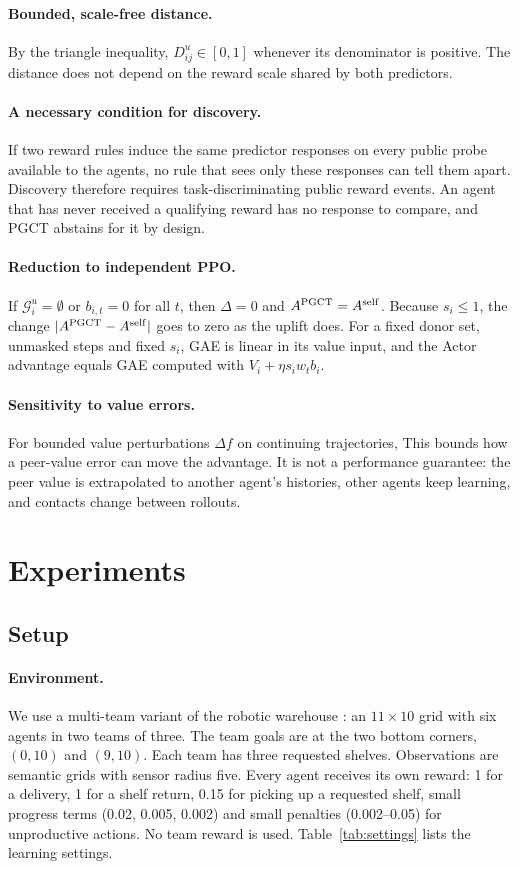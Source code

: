 \documentclass{article}
\begin{document}
\paragraph{Bounded, scale-free distance.} By the triangle inequality, $D_{ij}^u\in[0,1]$ whenever its denominator is positive. The distance does not depend on the reward scale shared by both predictors.

\paragraph{A necessary condition for discovery.} If two reward rules induce the same predictor responses on every public probe available to the agents, no rule that sees only these responses can tell them apart. Discovery therefore requires task-discriminating public reward events. An agent that has never received a qualifying reward has no response to compare, and PGCT abstains for it by design.

\paragraph{Reduction to independent PPO.} If $\mathcal G_i^u=\emptyset$ or $b_{i,t}=0$ for all $t$, then $\Delta=0$ and $A^{\rm PGCT}=A^{\rm self}$. Because $s_i\le1$, the change $|A^{\rm PGCT}-A^{\rm self}|$ goes to zero as the uplift does. For a fixed donor set, unmasked steps and fixed $s_i$, GAE is linear in its value input, and the Actor advantage equals GAE computed with $V_i+\eta s_i w_t b_i$.

\paragraph{Sensitivity to value errors.} For bounded value perturbations $\Delta f$ on continuing trajectories,
\BoundEquation
This bounds how a peer-value error can move the advantage. It is not a performance guarantee: the peer value is extrapolated to another agent's histories, other agents keep learning, and contacts change between rollouts.

\section{Experiments}
\subsection{Setup}
\paragraph{Environment.} We use a multi-team variant of the robotic warehouse \cite{benchmark}: an $11\times10$ grid with six agents in two teams of three. The team goals are at the two bottom corners, $(0,10)$ and $(9,10)$. Each team has three requested shelves. Observations are semantic grids with sensor radius five. Every agent receives its own reward: 1 for a delivery, 1 for a shelf return, 0.15 for picking up a requested shelf, small progress terms (0.02, 0.005, 0.002) and small penalties (0.002--0.05) for unproductive actions. No team reward is used. Table~\ref{tab:settings} lists the learning settings.
\end{document}
